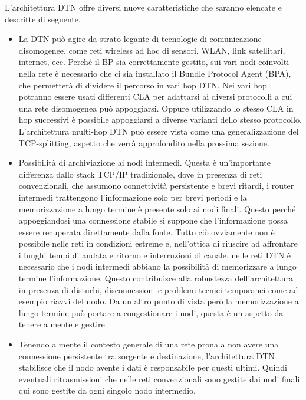 \documentclass[a4paper]{article}
\begin{document}
		
		L'architettura DTN offre diversi nuove caratteristiche che saranno elencate e descritte di seguente.
		\begin{itemize}
			\item La DTN può agire da strato legante di tecnologie di comunicazione disomogenee, come reti wireless ad hoc di sensori, WLAN, link satellitari, internet, ecc. Perché il BP sia correttamente gestito, sui vari nodi coinvolti nella rete è necessario che ci sia installato il Bundle Protocol Agent (BPA), che permetterà di dividere il percorso in vari hop DTN. Nei vari hop potranno essere usati differenti CLA per adattarsi ai diversi protocolli a cui una rete disomogenea può appoggiarsi. Oppure utilizzando lo stesso CLA in hop successivi è possibile appoggiarsi a diverse varianti dello stesso protocollo. L'architettura multi-hop DTN può essere vista come una generalizzazione del TCP-splitting, aspetto che verrà approfondito nella prossima sezione.
			
			\item Possibilità di archiviazione ai nodi intermedi. Questa è un'importante differenza dallo stack TCP/IP tradizionale, dove in presenza di reti convenzionali, che assumono connettività persistente e brevi ritardi, i router intermedi trattengono l'informazione solo per brevi periodi e la memorizzazione a lungo termine è presente solo ai nodi finali. Questo perché appoggiandosi una connessione stabile si suppone che l'informazione possa essere recuperata direttamente dalla fonte. Tutto ciò ovviamente non è possibile nelle reti in condizioni estreme e, nell'ottica di riuscire ad affrontare i lunghi tempi di andata e ritorno e interruzioni di canale, nelle reti DTN è necessario che i nodi intermedi abbiano la possibilità di memorizzare a lungo termine l'informazione. Questo contribuisce alla robustezza dell'architettura in presenza di disturbi, disconnessioni e problemi tecnici temporanei come ad esempio riavvi del nodo. Da un altro punto di vista però la memorizzazione a lungo termine può portare a congestionare i nodi, questa è un aspetto da tenere a mente e gestire.
			
			\item Tenendo a mente il contesto generale di una rete prona a non avere una connessione persistente tra sorgente e destinazione, l'architettura DTN stabilisce che il nodo avente i dati è responsabile per questi ultimi. Quindi eventuali ritrasmissioni che nelle reti convenzionali sono gestite dai nodi finali qui sono gestite da ogni singolo nodo intermedio.
			

\end{itemize}
\end{document}
